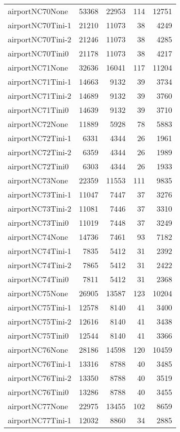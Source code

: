 \begin{longtable}{lrrrr}
airportNC70None & 53368 & 22953 & 114 & 12751 \\
airportNC70Tini-1 & 21210 & 11073 & 38 & 4249 \\
airportNC70Tini-2 & 21246 & 11073 & 38 & 4285 \\
airportNC70Tini0 & 21178 & 11073 & 38 & 4217 \\
airportNC71None & 32636 & 16041 & 117 & 11204 \\
airportNC71Tini-1 & 14663 & 9132 & 39 & 3734 \\
airportNC71Tini-2 & 14689 & 9132 & 39 & 3760 \\
airportNC71Tini0 & 14639 & 9132 & 39 & 3710 \\
airportNC72None & 11889 & 5928 & 78 & 5883 \\
airportNC72Tini-1 & 6331 & 4344 & 26 & 1961 \\
airportNC72Tini-2 & 6359 & 4344 & 26 & 1989 \\
airportNC72Tini0 & 6303 & 4344 & 26 & 1933 \\
airportNC73None & 22359 & 11553 & 111 & 9835 \\
airportNC73Tini-1 & 11047 & 7447 & 37 & 3276 \\
airportNC73Tini-2 & 11081 & 7446 & 37 & 3310 \\
airportNC73Tini0 & 11019 & 7448 & 37 & 3249 \\
airportNC74None & 14736 & 7461 & 93 & 7182 \\
airportNC74Tini-1 & 7835 & 5412 & 31 & 2392 \\
airportNC74Tini-2 & 7865 & 5412 & 31 & 2422 \\
airportNC74Tini0 & 7811 & 5412 & 31 & 2368 \\
airportNC75None & 26905 & 13587 & 123 & 10204 \\
airportNC75Tini-1 & 12578 & 8140 & 41 & 3400 \\
airportNC75Tini-2 & 12616 & 8140 & 41 & 3438 \\
airportNC75Tini0 & 12544 & 8140 & 41 & 3366 \\
airportNC76None & 28186 & 14598 & 120 & 10459 \\
airportNC76Tini-1 & 13316 & 8788 & 40 & 3485 \\
airportNC76Tini-2 & 13350 & 8788 & 40 & 3519 \\
airportNC76Tini0 & 13286 & 8788 & 40 & 3455 \\
airportNC77None & 22975 & 13455 & 102 & 8659 \\
airportNC77Tini-1 & 12032 & 8860 & 34 & 2885 \\

\end{longtable}
